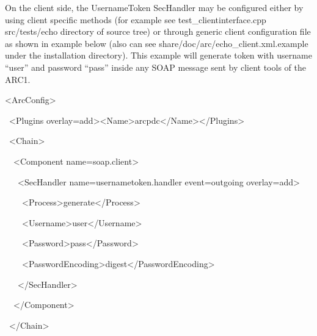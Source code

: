 \documentclass{article}
\begin{document}
{\color{black}
On the client side, the UsernameToken SecHandler may be configured
either by using client specific methods (for example see
test\_clientinterface.cpp src/tests/echo directory of source tree) or
through generic client configuration file as shown in example below
(also can see share/doc/arc/echo\_client.xml.example under the
installation directory). This example will generate token with username
{\textquotedblleft}user{\textquotedblright} and password
{\textquotedblleft}pass{\textquotedblright} inside any SOAP message
sent by client tools of the ARC1.}

{\ttfamily\color{black}
{\textless}ArcConfig{\textgreater}}

{\ttfamily\color{black}
\ {\textless}Plugins
overlay={\textquotedbl}add{\textquotedbl}{\textgreater}{\textless}Name{\textgreater}arcpdc{\textless}/Name{\textgreater}{\textless}/Plugins{\textgreater}}

{\ttfamily\color{black}
\ {\textless}Chain{\textgreater}}

{\ttfamily\color{black}
\ \ {\textless}Component
name={\textquotedbl}soap.client{\textquotedbl}{\textgreater}}

{\ttfamily\color{black}
\ \ \ {\textless}SecHandler
name={\textquotedbl}usernametoken.handler{\textquotedbl}
event={\textquotedbl}outgoing{\textquotedbl}
overlay={\textquotedbl}add{\textquotedbl}{\textgreater}}

{\ttfamily\color{black}
\ \ \ \ {\textless}Process{\textgreater}generate{\textless}/Process{\textgreater}}

{\ttfamily\color{black}
\ \ \ \ {\textless}Username{\textgreater}user{\textless}/Username{\textgreater}}

{\ttfamily\color{black}
\ \ \ \ {\textless}Password{\textgreater}pass{\textless}/Password{\textgreater}}

{\ttfamily\color{black}
\ \ \ \ {\textless}PasswordEncoding{\textgreater}digest{\textless}/PasswordEncoding{\textgreater}}

{\ttfamily\color{black}
\ \ \ {\textless}/SecHandler{\textgreater}}

{\ttfamily\color{black}
\ \ {\textless}/Component{\textgreater}}

{\ttfamily\color{black}
\ {\textless}/Chain{\textgreater}}
\end{document}
